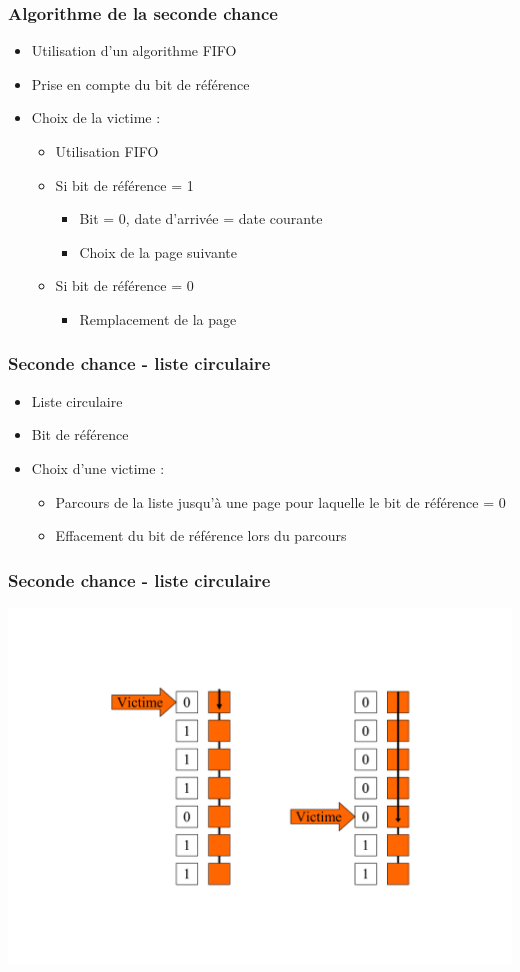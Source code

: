 \begin{frame}
\frametitle{Algorithme de la seconde chance}
\begin{itemize}
\item Utilisation d'un algorithme FIFO
\item Prise en compte du bit de référence
\item Choix de la victime :
\begin{itemize}
\item Utilisation FIFO
\item Si bit de référence = 1
\begin{itemize}
\item Bit = 0, date d'arrivée = date courante
\item Choix de la page suivante
\end{itemize}
\item Si bit de référence = 0
\begin{itemize}
\item Remplacement de la page
\end{itemize}
\end{itemize}
\end{itemize}
\end{frame}


\begin{frame}
\frametitle{Seconde chance - liste circulaire}
\begin{itemize}
\item Liste circulaire
\item Bit de référence
\item Choix d'une victime :
\begin{itemize}
\item Parcours de la liste jusqu'à une page pour laquelle le bit de référence = 0
\item Effacement du bit de référence lors du parcours
\end{itemize}
\end{itemize}
\end{frame}


\begin{frame}
\frametitle{Seconde chance - liste circulaire}
\includegraphics[width=.8\textwidth]{../illustration/remplacement_seconde_chance_liste.pdf}
\end{frame}


